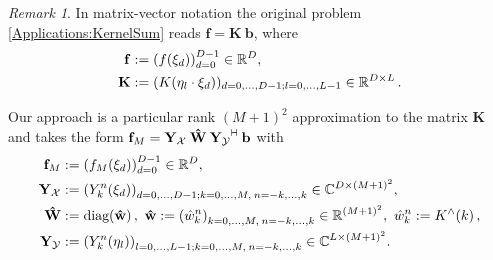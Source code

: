 \documentclass[11pt,a4paper,twoside,bibtotoc]{scrartcl}
\theoremstyle{plain}
\theoremstyle{definition}
\theoremstyle{remark}
\newtheorem{remark}[theorem]{Remark}
\newcommand{\adj}{{\vdash \hspace*{-1.72mm} \dashv}}
\newcommand{\R}{\ensuremath{\mathbb{R}}}
\newcommand{\C}{\ensuremath{\mathbb{C}}}
\newcommand{\fun}[2]{\ensuremath{#1{\hspace{-0.4ex}}\left(#2\right)}}
\newcommand{\paren}[1]{\ensuremath{\left(#1\right)}}
\newcommand{\mb}[1]{\mathbf{#1}}
\newcommand{\V}[1]{\mb{#1}}
\newcommand{\diag}{\text{\rm{diag}}}
\numberwithin{equation}{section}
\numberwithin{table}{section}
\numberwithin{figure}{section}
\begin{document}
\begin{remark}\label{rem:rankM}
In matrix-vector notation the original problem \eqref{Applications:KernelSum} reads $\V{f}=\V{K} \: \V{b}$,
where
\begin{align*}
  \V{f} & := \paren{\fun{f}{\V{\xi}_{d}}}_{d=0}^{D-1} \in \R^D,\\
  \V{K} & :=(\fun{K}{\V{\eta}_{l} \cdot
  \V{\xi}_d})_{d=0,\hdots,D-1;l=0,\hdots,L-1}\in \R^{D\times L}\,.
\end{align*}

Our approach is a particular rank $(M+1)^2$ approximation to the matrix $\V{K}$ and takes the form
$
  \V{f}_M = \V{Y_{\mathcal{X}}} \: \V{\hat W} \:
  \V{Y_{\mathcal{Y}}}^{\adj} \: \V{b}
$
with
\begin{align}
  \nonumber
  \V{f}_M & := \paren{\fun{f_M}{\V{\xi}_{d}}}_{d=0}^{D-1} \in \R^D,
  \\ \nonumber
  \V{Y_{\mathcal{X}}} & := \paren{\fun{Y_k^n}{\V{\xi}_{d}}}_{d=0,\ldots,D-1;
  k=0,\ldots,M,\:n=-k,\ldots,k} \in \C^{D \times
  \paren{M+1}^2}, \\ \nonumber
  \V{\hat W} & := \fun{\diag}{\V{\hat w}},\ \V{\hat w} := \paren{\hat
  w_{k}^{n}}_{k=0,\ldots,M,\:n=-k,\ldots,k} \in \R^{(M+1)^2},\ \hat w_{k}^n :=
  \fun{K^{\wedge}}{k}, \\ \nonumber
  \V{Y_{\mathcal{Y}}} & := \paren{\fun{Y_k^n}{\V{\eta}_{l}}}_{l=0,\ldots,L-1;
  k=0,\ldots,M,\:n=-k,\ldots,k} \in \C^{L \times \paren{M+1}^2}.
\end{align}
\end{remark}
\end{document}
